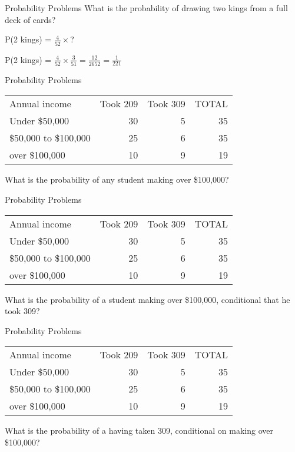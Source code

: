 \documentclass[presentation]{beamer}
\begin{document}
\begin{frame}[label={sec:orga5c984c}]{Probability Problems}
What is the probability of drawing two kings from a full deck of cards?

\pause

P(2 kings) = \(\frac{4}{52} \times\)?

\pause

P(2 kings) = \(\frac{4}{52} \times \frac{3}{51} = \frac{12}{2652} =\frac{1}{221}\)
\end{frame}


\begin{frame}[label={sec:org4501153}]{Probability Problems}
\begin{center}
\begin{tabular}{lrrr}
Annual income & Took 209 & Took 309 & TOTAL\\
Under \$50,000 & 30 & 5 & 35\\
\$50,000 to \$100,000 & 25 & 6 & 35\\
over \$100,000 & 10 & 9 & 19\\
\end{tabular}
\end{center}

What is the probability of any student making over \$100,000?
\end{frame}



\begin{frame}[label={sec:org2cab0ff}]{Probability Problems}
\begin{center}
\begin{tabular}{lrrr}
Annual income & Took 209 & Took 309 & TOTAL\\
Under \$50,000 & 30 & 5 & 35\\
\$50,000 to \$100,000 & 25 & 6 & 35\\
over \$100,000 & 10 & 9 & 19\\
\end{tabular}
\end{center}

What is the probability of a student making over \$100,000, conditional that he took 309?
\end{frame}



\begin{frame}[label={sec:org80a4179}]{Probability Problems}
\begin{center}
\begin{tabular}{lrrr}
Annual income & Took 209 & Took 309 & TOTAL\\
Under \$50,000 & 30 & 5 & 35\\
\$50,000 to \$100,000 & 25 & 6 & 35\\
over \$100,000 & 10 & 9 & 19\\
\end{tabular}
\end{center}


What is the probability of a having taken 309, conditional on  making over \$100,000?
\end{frame}
\end{document}
